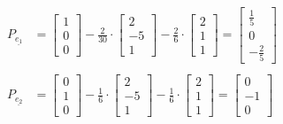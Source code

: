 \documentclass[11pt, a4paper, norsk]{NTNUoving}
\begin{document}
\begin{oppgave}
\begin{punkt}
            \begin{align*}
                P_{\underline{e_1}} &= \begin{bmatrix}
                    1 \\ 
                    0 \\
                    0
                \end{bmatrix} - \frac{2}{30} \cdot \begin{bmatrix}
                    2 \\
                    -5 \\
                    1
                \end{bmatrix} - \frac{2}{6} \cdot \begin{bmatrix}
                    2 \\
                    1 \\
                    1
                \end{bmatrix} = \begin{bmatrix}
                    \frac{1}{5} \\
                    0 \\
                    -\frac{2}{5}
                \end{bmatrix}
                \\
                \\
                    P_{\underline{e_{2}}} &= \begin{bmatrix}
                    0 \\ 
                    1 \\
                    0
                \end{bmatrix} - \frac{1}{6} \cdot \begin{bmatrix}
                    2 \\
                    -5 \\
                    1
                \end{bmatrix} - \frac{1}{6} \cdot \begin{bmatrix}
                    2 \\
                    1 \\
                    1
                \end{bmatrix} = \begin{bmatrix}
                    0 \\
                    -1 \\
                    0
                \end{bmatrix}

\end{align*}
\end{punkt}
\end{oppgave}
\end{document}
